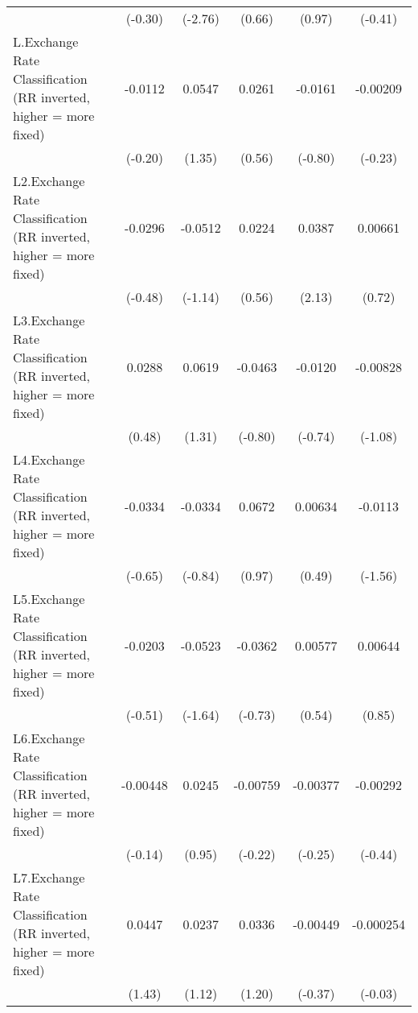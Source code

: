 {\begin{longtable}{l*{5}{c}}
                &  (-0.30)         &  (-2.76)         &   (0.66)         &   (0.97)         &  (-0.41)         \\
[1em]
L.Exchange Rate Classification (RR inverted, higher = more fixed)&  -0.0112         &   0.0547         &   0.0261         &  -0.0161         & -0.00209         \\
                &  (-0.20)         &   (1.35)         &   (0.56)         &  (-0.80)         &  (-0.23)         \\
[1em]
L2.Exchange Rate Classification (RR inverted, higher = more fixed)&  -0.0296         &  -0.0512         &   0.0224         &   0.0387\sym{*}  &  0.00661         \\
                &  (-0.48)         &  (-1.14)         &   (0.56)         &   (2.13)         &   (0.72)         \\
[1em]
L3.Exchange Rate Classification (RR inverted, higher = more fixed)&   0.0288         &   0.0619         &  -0.0463         &  -0.0120         & -0.00828         \\
                &   (0.48)         &   (1.31)         &  (-0.80)         &  (-0.74)         &  (-1.08)         \\
[1em]
L4.Exchange Rate Classification (RR inverted, higher = more fixed)&  -0.0334         &  -0.0334         &   0.0672         &  0.00634         &  -0.0113         \\
                &  (-0.65)         &  (-0.84)         &   (0.97)         &   (0.49)         &  (-1.56)         \\
[1em]
L5.Exchange Rate Classification (RR inverted, higher = more fixed)&  -0.0203         &  -0.0523         &  -0.0362         &  0.00577         &  0.00644         \\
                &  (-0.51)         &  (-1.64)         &  (-0.73)         &   (0.54)         &   (0.85)         \\
[1em]
L6.Exchange Rate Classification (RR inverted, higher = more fixed)& -0.00448         &   0.0245         & -0.00759         & -0.00377         & -0.00292         \\
                &  (-0.14)         &   (0.95)         &  (-0.22)         &  (-0.25)         &  (-0.44)         \\
[1em]
L7.Exchange Rate Classification (RR inverted, higher = more fixed)&   0.0447         &   0.0237         &   0.0336         & -0.00449         &-0.000254         \\
                &   (1.43)         &   (1.12)         &   (1.20)         &  (-0.37)         &  (-0.03)         \\

\end{longtable}}
